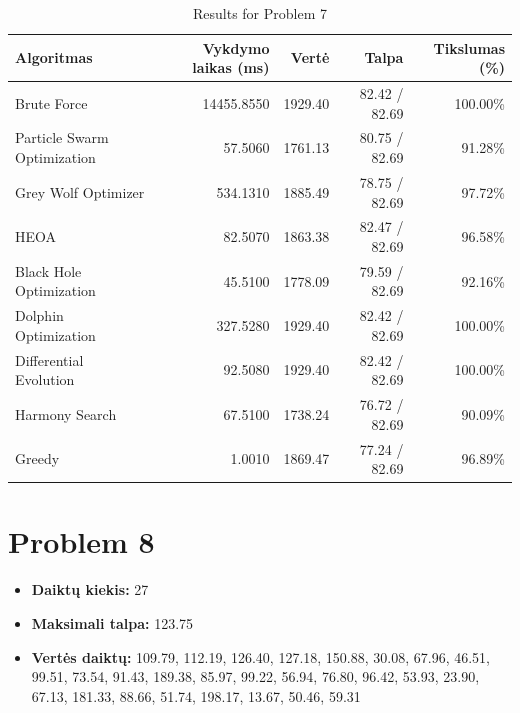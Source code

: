 \documentclass[a4paper,11pt]{article}
\begin{document}
\begin{table}[h!]
\centering
\begin{tabular}{lrrrr}
\toprule
\textbf{Algoritmas} & \textbf{Vykdymo laikas (ms)} & \textbf{Vertė} & \textbf{Talpa} & \textbf{Tikslumas (\%)} \\
\midrule
Brute Force & 14455.8550 & 1929.40 & 82.42 / 82.69 & 100.00\% \\
Particle Swarm Optimization & 57.5060 & 1761.13 & 80.75 / 82.69 & 91.28\% \\
Grey Wolf Optimizer & 534.1310 & 1885.49 & 78.75 / 82.69 & 97.72\% \\
HEOA & 82.5070 & 1863.38 & 82.47 / 82.69 & 96.58\% \\
Black Hole Optimization & 45.5100 & 1778.09 & 79.59 / 82.69 & 92.16\% \\
Dolphin Optimization & 327.5280 & 1929.40 & 82.42 / 82.69 & 100.00\% \\
Differential Evolution & 92.5080 & 1929.40 & 82.42 / 82.69 & 100.00\% \\
Harmony Search & 67.5100 & 1738.24 & 76.72 / 82.69 & 90.09\% \\
Greedy & 1.0010 & 1869.47 & 77.24 / 82.69 & 96.89\% \\
\bottomrule
\end{tabular}
\caption{Results for Problem 7}
\end{table}
\clearpage

\section*{Problem 8}
\begin{itemize}
    \item \textbf{Daiktų kiekis:} 27
    \item \textbf{Maksimali talpa:} 123.75
    \item \textbf{Vertės daiktų:} 109.79, 112.19, 126.40, 127.18, 150.88, 30.08, 67.96, 46.51, 99.51, 73.54, 91.43, 189.38, 85.97, 99.22, 56.94, 76.80, 96.42, 53.93, 23.90, 67.13, 181.33, 88.66, 51.74, 198.17, 13.67, 50.46, 59.31
\end{itemize}
\end{document}
